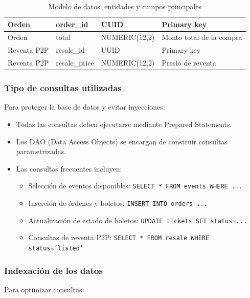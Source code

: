 \documentclass[12pt,letterpaper]{article}
\begin{document}
\begin{table}[H]
\begin{tabularx}{\textwidth}{|l|l|l|X|}
Orden       & order\_id       & UUID                             & Primary key                        \\ \hline
Orden       & total           & NUMERIC(12,2)                    & Monto total de la compra           \\ \hline

Reventa P2P & resale\_id      & UUID                             & Primary key                        \\ \hline
Reventa P2P & resale\_price   & NUMERIC(12,2)                    & Precio de reventa                  \\ \hline

\end{tabularx}

\caption{Modelo de datos: entidades y campos principales}
\label{tab:modelo_datos_principal}
\normalsize
\end{table}

\subsubsection{Tipo de consultas utilizadas}
Para proteger la base de datos y evitar inyecciones:

\begin{itemize}
    \item Todas las consultas deben ejecutarse mediante Prepared Statements.
    \item Los DAO (Data Access Objects) se encargan de construir consultas parametrizadas.
    \item Las consultas frecuentes incluyen:
    \begin{itemize}
    \item Selección de eventos disponibles: \texttt{SELECT * FROM events WHERE ...}
    \item Inserción de órdenes y boletos: \texttt{INSERT INTO orders ...}
    \item Actualización de estado de boletos: \texttt{UPDATE tickets SET status=...}
    \item Consultas de reventa P2P: \texttt{SELECT * FROM resale WHERE status='listed'}
\end{itemize} 
\end{itemize}

\subsubsection{Indexación de los datos}
Para optimizar consultas:
\end{document}
